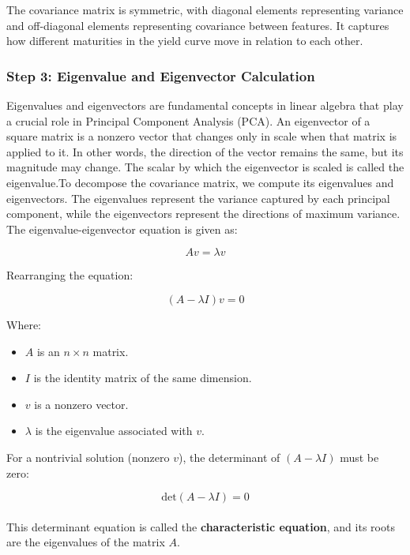 \documentclass[12pt]{article}
\begin{document}
\vspace{1em}

The covariance matrix is symmetric, with diagonal elements representing variance and off-diagonal elements representing covariance between features. It captures how different maturities in the yield curve move in relation to each other.

\subsubsection{Step 3: Eigenvalue and Eigenvector Calculation}

Eigenvalues and eigenvectors are fundamental concepts in linear algebra that play a crucial role in Principal Component Analysis (PCA). An eigenvector of a square matrix is a nonzero vector that changes only in scale when that matrix is applied to it. In other words, the direction of the vector remains the same, but its magnitude may change. The scalar by which the eigenvector is scaled is called the eigenvalue.To decompose the covariance matrix, we compute its eigenvalues and eigenvectors. The eigenvalues represent the variance captured by each principal component, while the eigenvectors represent the directions of maximum variance. \\

The eigenvalue-eigenvector equation is given as:

\[
Av = \lambda v
\]

Rearranging the equation:

\[
(A - \lambda I)v = 0
\]

Where:
\begin{itemize}
    \item \(A\) is an \(n \times n\) matrix.
    \item \(I\) is the identity matrix of the same dimension.
    \item \(v\) is a nonzero vector.
    \item \(\lambda\) is the eigenvalue associated with \(v\).
\end{itemize}
\vspace{2em}

For a nontrivial solution (nonzero \(v\)), the determinant of \((A - \lambda I)\) must be zero:

\[
\text{det}(A - \lambda I) = 0
\]\\

This determinant equation is called the \textbf{characteristic equation}, and its roots are the eigenvalues of the matrix \(A\).\\
\end{document}
